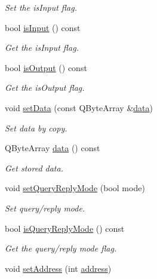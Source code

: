 \begin{DoxyCompactItemize}
\begin{DoxyCompactList}\small\item\em Set the is\-Input flag. \end{DoxyCompactList}\item 
bool \hyperlink{classmdt_port_transaction_a2aaf0f003556d7f93ec2d3846589673d}{is\-Input} () const 
\begin{DoxyCompactList}\small\item\em Get the is\-Input flag. \end{DoxyCompactList}\item 
bool \hyperlink{classmdt_port_transaction_af628e8888c15525777504111a687b6a0}{is\-Output} () const 
\begin{DoxyCompactList}\small\item\em Get the is\-Output flag. \end{DoxyCompactList}\item 
void \hyperlink{classmdt_port_transaction_a9487e13f95c553cead6e2043573615d9}{set\-Data} (const Q\-Byte\-Array \&\hyperlink{classmdt_port_transaction_a2b4f95dae82de8853e12138b4db616a0}{data})
\begin{DoxyCompactList}\small\item\em Set data by copy. \end{DoxyCompactList}\item 
Q\-Byte\-Array \hyperlink{classmdt_port_transaction_a2b4f95dae82de8853e12138b4db616a0}{data} () const 
\begin{DoxyCompactList}\small\item\em Get stored data. \end{DoxyCompactList}\item 
void \hyperlink{classmdt_port_transaction_a6bd68a89059c790f475b8ff78c943656}{set\-Query\-Reply\-Mode} (bool mode)
\begin{DoxyCompactList}\small\item\em Set query/reply mode. \end{DoxyCompactList}\item 
bool \hyperlink{classmdt_port_transaction_a9da1cc7a191cd21a2e532d277aa3c628}{is\-Query\-Reply\-Mode} () const 
\begin{DoxyCompactList}\small\item\em Get the query/reply mode flag. \end{DoxyCompactList}\item 
void \hyperlink{classmdt_port_transaction_a7f43ee802c0dee3ee77b45188378f86e}{set\-Address} (int \hyperlink{classmdt_port_transaction_a0c454829c2d1c2ea1b8bcc9797b2d46b}{address})

\end{DoxyCompactItemize}
